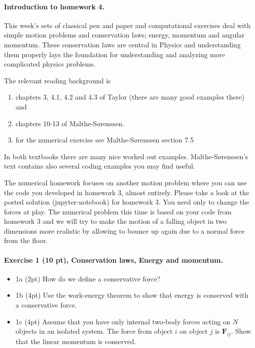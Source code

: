 \documentclass[%
oneside,                 %
final,                   %
10pt]{article}
\begin{document}
\noindent
\paragraph{Introduction to homework 4.}
This week's sets of classical pen and paper and computational
exercises deal with simple motion problems and conservation laws;
energy, momentum and angular momentum. These conservation laws are
central in Physics and understanding them properly lays the foundation
for understanding and analyzing more complicated physics problems.

The relevant reading background is
\begin{enumerate}
\item chapters 3, 4.1, 4.2 and 4.3 of Taylor (there are many good examples there) and

\item chapters 10-13 of Malthe-Sørenssen.

\item for the numerical exercise see Malthe-Sørenssen section 7.5
\end{enumerate}

\noindent
In both textbooks there are many nice worked out examples. Malthe-Sørenssen's text contains also several coding examples you may find useful. 

The numerical homework focuses on another motion problem where you can
use the code you developed in homework 3, almost entirely. Please take
a look at the posted solution (jupyter-notebook) for homework 3. You
need only to change the forces at play. The numerical problem this time is based
on your code from homework 3 and we will try to make the motion of a falling object in two dimensions more realistic by allowing to bounce up again due to a normal force from the floor. 

\paragraph{Exercise 1 (10 pt), Conservation laws, Energy and momentum.}
\begin{itemize}
\item 1a (2pt) How do we define a conservative force?

\item 1b (4pt) Use the work-energy theorem to show that energy is conserved with a conservative force.

\item 1c (4pt) Assume that you have only internal two-body forces acting on $N$ objects in an isolated system. The force from object $i$ on object $j$ is $\bm{F}_{ij}$. Show that the linear momentum is conserved.
\end{itemize}
\end{document}
